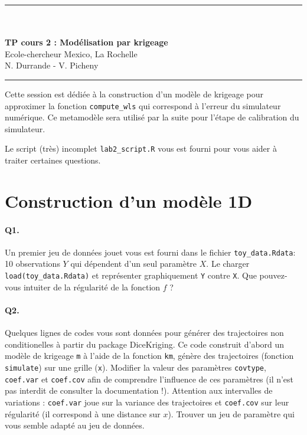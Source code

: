 \documentclass[12pt]{scrartcl}
\begin{document}
\begin{center}
	\rule{\textwidth}{1pt}
	\\ \ \\
	{\LARGE \textbf{TP cours 2 : Modélisation par krigeage}}\\
	\vspace{3mm}
	{\large Ecole-chercheur Mexico, La Rochelle \\ \vspace{3mm}}
	{\normalsize N. Durrande - V. Picheny}\\
	\vspace{3mm}
	\rule{\textwidth}{1pt}
	\vspace{5mm}
\end{center}
Cette session est dédiée à la construction d'un modèle de krigeage pour approximer la fonction  \texttt{compute\_wls} qui correspond à l'erreur du simulateur numérique. Ce metamodèle sera utilisé par la suite pour l'étape de calibration du simulateur.

Le script (très) incomplet \texttt{lab2\_script.R} vous est fourni pour vous aider à traiter certaines questions.

\section{Construction d'un modèle 1D}

\paragraph{Q1.} Un premier jeu de données jouet vous est fourni dans le fichier \texttt{toy\_data.Rdata}: 10 observations $Y$ qui dépendent d'un seul paramètre $X$. 
Le charger \texttt{load(toy\_data.Rdata)} et représenter graphiquement \texttt{Y} contre \texttt{X}. Que pouvez-vous intuiter de la régularité de la fonction $f$ ?

\paragraph{Q2.} Quelques lignes de codes vous sont données pour générer des trajectoires non conditionelles à partir du package DiceKriging. Ce code construit d'abord un modèle de krigeage \texttt{m} à l'aide de la fonction \texttt{km},
génère des trajectoires (fonction \texttt{simulate}) sur une grille (\texttt{x}). Modifier la valeur des paramètres \texttt{covtype}, \texttt{coef.var} et \texttt{coef.cov} 
afin de comprendre l'influence de ces paramètres (il n'est pas interdit de consulter la documentation !). Attention aux intervalles de variations : \texttt{coef.var} joue sur la variance des trajectoires
et \texttt{coef.cov} sur leur régularité (il correspond à une distance sur $x$). Trouver un jeu de paramètre qui vous semble adapté au jeu de données.
\end{document}
